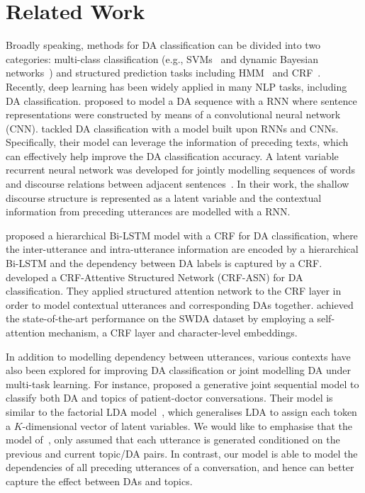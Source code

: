 \documentclass[11pt,a4paper]{article}
\begin{document}
\section{Related Work} \label{sec:relate}

Broadly speaking, methods for DA classification can be divided into two  categories: multi-class classification (e.g., 
SVMs~\cite{liu2006using} and dynamic Bayesian networks~\cite{dielmann2008recognition}) and structured prediction tasks including HMM~\cite{stolcke2000dialogue} and CRF~\cite{kim2010classifying}. 
Recently, deep learning has been widely applied in many NLP tasks, including DA classification. \citet{kalchbrenner2013recurrent}  proposed to model a DA sequence with a 
RNN where sentence representations were constructed by means of a convolutional neural network (CNN). \citet{lee2016sequential}  tackled DA classification with a model built upon RNNs and CNNs. Specifically, their model can leverage the information of preceding texts, which can effectively help improve the DA classification accuracy. 
A latent variable recurrent neural network was developed for jointly modelling sequences of words and discourse relations between adjacent sentences~\cite{ji2016latent}. In their work, the shallow discourse structure is represented as a latent variable and the contextual information from preceding utterances are modelled with a RNN. 

\citet{kumar2017dialogue}  proposed a hierarchical
Bi-LSTM model with a CRF for DA classification, where the inter-utterance and intra-utterance information are encoded by a hierarchical Bi-LSTM and the dependency between DA labels is captured by a CRF. \citet{chen2018dialogue} developed a CRF-Attentive Structured Network (CRF-ASN) for DA classification. They applied structured attention network to the CRF layer in order to model contextual utterances and corresponding DAs together. \citet{raheja2019dialogue} achieved the state-of-the-art performance on the SWDA dataset by employing a self-attention mechanism, a CRF layer and character-level embeddings.



In addition to modelling dependency between utterances, various contexts have also been explored for improving DA classification or joint modelling DA under multi-task learning. 
For instance, \citet{wallace2013generative}  proposed a generative joint sequential model to classify both DA and topics of patient-doctor conversations. Their model is similar to the factorial LDA model~\cite{paul2012factorial}, which generalises LDA to assign each token a $K$-dimensional vector of latent variables. We would like to emphasise that the model of~\citet{wallace2013generative}, 
only assumed that each utterance is generated conditioned on the previous and current topic/DA pairs. In contrast, our model is able to model the dependencies of all preceding  utterances of a conversation, and hence can better capture the effect between DAs and topics.
\end{document}
